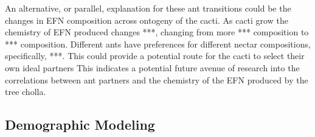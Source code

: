 \documentclass[12pt,a4paper]{article}
\begin{document}
		
		An alternative, or parallel, explanation for these ant transitions could be the changes in EFN composition across ontogeny of the cacti.
		As cacti grow the chemistry of EFN produced changes ***, changing from more *** composition to *** composition. 
		Different ants have preferences for different nectar compositions\cite{Lach2010}, specifically, ***.
		This could provide a potential route for the cacti to select their own ideal partners
		This indicates a potential future avenue of research into the correlations between ant partners and the chemistry of the EFN produced by the tree cholla. 
		
		\subsection*{Demographic Modeling}

	
\end{document}
